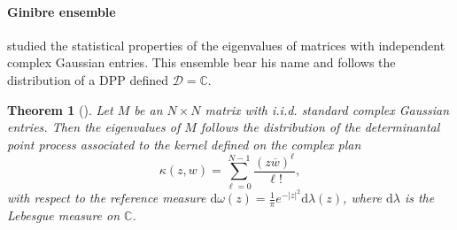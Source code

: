 \documentclass[twoside,11pt]{book}
\newtheorem{theorem}{Theorem}
\numberwithin{theorem}{chapter}
\numberwithin{definition}{chapter}
\numberwithin{proposition}{chapter}
\numberwithin{corollary}{chapter}
\numberwithin{example}{chapter}
\numberwithin{lemma}{chapter}
\numberwithin{assumption}{chapter}
\begin{document}







\paragraph{Ginibre ensemble}
\cite{Gin65} studied the statistical properties of the eigenvalues of matrices with independent complex Gaussian entries. This ensemble bear his name and follows the distribution of a DPP defined $\mathcal{D} = \mathbb{C}$.
\begin{theorem}[\cite{Gin65}]
Let $M$ be an $N\times N$ matrix with i.i.d. standard complex Gaussian entries.
Then the eigenvalues of $M$ follows the distribution of the determinantal point
process associated to the kernel defined on the complex plan
\begin{equation}
\kappa(z,w) = \sum\limits_{\ell =0}^{N-1} \frac{(z \overline{w})^{\ell}}{\ell!},
\end{equation}
with respect to the reference measure $\mathrm{d}\omega(z) = \frac{1}{\pi}e^{-|z|^{2}} \mathrm{d}\lambda(z)$, where $\mathrm{d}\lambda$ is the Lebesgue measure on $\mathbb{C}$.
\end{theorem}
\end{document}
